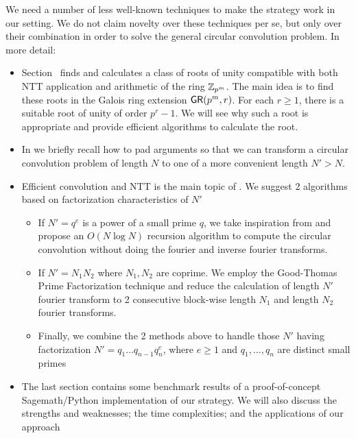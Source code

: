 We need a number of less well-known techniques to make the strategy work in our setting. We do not claim novelty over these techniques per se, but only over their combination in order to solve the general circular convolution problem. In more detail:
\begin{itemize}
    \item Section~ finds and calculates a class of roots of unity compatible with both NTT application and arithmetic of the ring \(\mathbb{Z}_{p^m}\). The main idea is to find these roots in the Galois ring extension \(\mathsf{GR}(p^m, r)\). For each \(r \ge 1\), there is a suitable root of unity of order \(p^r - 1\). We will see why such a root is appropriate and provide efficient algorithms to calculate the root.
    \item In  we briefly recall how to pad arguments so that we can transform a circular convolution problem of length \(N\) to one of a more convenient length \(N' > N\).
    \item Efficient convolution and NTT is the main topic of . We suggest 2 algorithms based on factorization characteristics of \(N'\)
    \begin{itemize}
        \item If \(N' = q^e\) is a power of a small prime \(q\), we take inspiration from  and propose an \(O(N \log N)\) recursion algorithm to compute the circular convolution without doing the fourier and inverse fourier transforms.
        \item If \(N' = N_1 N_2\) where \(N_1, N_2\) are coprime. We employ the Good-Thomas Prime Factorization technique  and reduce the calculation of length \(N'\) fourier transform to 2 consecutive block-wise length \(N_1\) and length \(N_2\) fourier transforms.
        \item Finally, we combine the 2 methods above to handle those \(N'\) having factorization \(N' = q_1 \ldots q_{n-1} q_n^e\), where \(e \ge 1\) and \(q_1, \ldots, q_n\) are distinct small primes
    \end{itemize}
    \item The last section contains some benchmark results of a proof-of-concept Sagemath/Python implementation of our strategy. We will also discuss the strengths and weaknesses; the time complexities; and the applications of our approach
\end{itemize}

